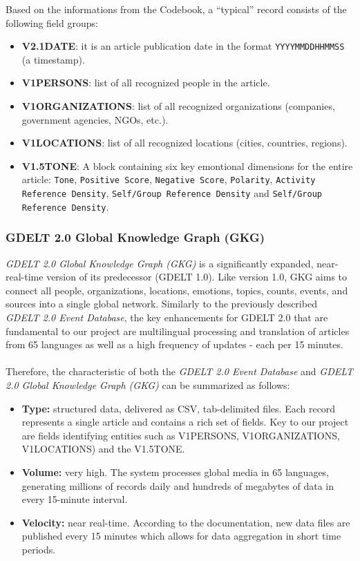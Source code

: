 \documentclass{article}
\begin{document}
Based on the informations from the Codebook, a ``typical'' record consists of the following field groups:

\begin{itemize}
    \item \textbf{V2.1DATE}: it is an article publication date in the format \texttt{YYYYMMDDHHMMSS} (a timestamp). 
    \item \textbf{V1PERSONS}: list of all recognized people in the article.
    \item \textbf{V1ORGANIZATIONS}: list of all recognized organizations (companies, government agencies, NGOs, etc.).
    \item \textbf{V1LOCATIONS}: list of all recognized locations (cities, countries, regions).
    \item \textbf{V1.5TONE}: A block containing six key emontional dimensions for the entire article: \texttt{Tone}, \texttt{Positive Score}, \texttt{Negative Score}, \texttt{Polarity}, \texttt{Activity Reference Density}, 
    \texttt{Self/Group Reference Density} and \texttt{Self/Group Reference Density}. 
\end{itemize}


\subsubsection{GDELT 2.0 Global Knowledge Graph (GKG)}

\textit{GDELT 2.0 Global Knowledge Graph (GKG)} is a significantly expanded, near-real-time version of its predecessor (GDELT 1.0). Like version 1.0, GKG aims to connect all people, organizations, locations, emotions, topics, counts, events, and sources into a single global network. 
Similarly to the previously described \textit{GDELT 2.0 Event Database}, the key enhancements for GDELT 2.0 that are fundamental to our project are multilingual processing and translation of articles from 65 languages as well as a high frequency of updates - each per 15 minutes. 

\paragraph{}
Therefore, the characteristic of both the \textit{GDELT 2.0 Event Database} and \textit{GDELT 2.0 Global Knowledge Graph (GKG)} can be summarized as follows:

\begin{itemize}
\item \textbf{Type:} structured data, delivered as CSV, tab-delimited files. Each record represents a single article and contains a rich set of fields. Key to our project are fields identifying entities such as V1PERSONS, V1ORGANIZATIONS, V1LOCATIONS) and the V1.5TONE. 
\item \textbf{Volume:} very high. The system processes global media in 65 languages, generating millions of records daily and hundreds of megabytes of data in every 15-minute interval. 
\item \textbf{Velocity:} near real-time. According to the documentation, new data files are published every 15 minutes which allows for data aggregation in short time periods. 
\end{itemize}
\end{document}
